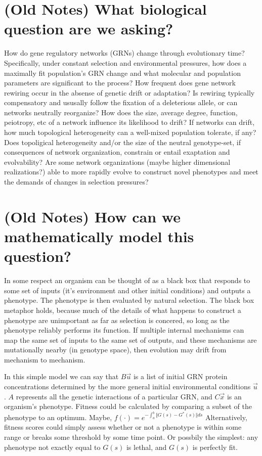 \documentclass[11 pt]{article}
\begin{document}
\section{(Old Notes) What biological question are we asking?}

How do gene regulatory networks (GRNs) change through evolutionary time?
Specifically, under constant selection and environmental pressures, how does a
maximally fit population's GRN change and what molecular and population
parameters are significant to the process? How frequent does gene network
rewiring occur in the absense of genetic drift or adaptation? Is rewiring
typically compensatory and ususally follow the fixation of a deleterious
allele, or can networks neutrally reorganize? How does the size, average
degree, function, peiotropy, etc of a network influence its likelihood to
drift? If networks can drift, how much topological heterogeneity can a
well-mixed population tolerate, if any? Does topoligical heterogeneity and/or
the size of the neutral genotype-set, if consequences of network organization,
constrain or entail exaptation and evolvability? Are some network organizations
(maybe higher dimensional realizations?) able to more rapidly evolve to
construct novel phenotypes and meet the demands of changes in selection
pressures?

\section{(Old Notes) How can we mathematically model this question?}

In some respect an organism can be thought of as a black box that responds to
some set of inputs (it's environment and other initial conditions) and outputs
a phenotype. The phenotype is then evaluated by natural selection. The black
box metaphor holds, because much of the details of what happens to construct a
phenotype are unimportant as far as selection is concered, so long as the
phenotype reliably performs its function. If multiple internal mechanisms can
map the same set of inputs to the same set of outputs, and these mechanisms are
mutationally nearby (in genotype space), then evolution may drift from
mechanism to mechanism. 

In this simple model we can say that $B\vec{u}$ is a list of initial GRN
protein concentrations determined by the more general initial environmental
conditions $\vec{u}$. $A$ represents all the genetic interactions of a
particular GRN, and $C\vec{x}$ is an organism's phenotype. Fitness could be
calculated by comparing a subset of the phenotype to an optimum. Maybe,
$f(\cdot) = e^{- \int_{a}^{b} \Vert G(s) - G^{*}(s) \Vert ds}$ Alternatively,
fitness scores could simply assess whether or not a phenotype is within some
range or breaks some threshold by some time point. Or possbily the simplest:
any phenotype not exactly equal to $G(s)$ is lethal, and $G(s)$ is perfectly
fit. 
\end{document}
